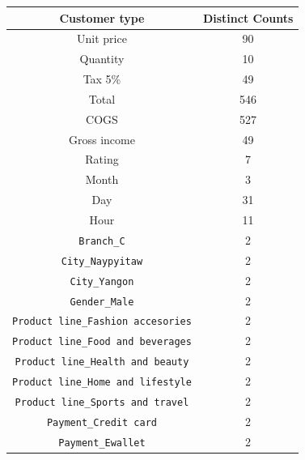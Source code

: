 \begin{table}[htbp]
    \centering
    \begin{adjustbox}{max width=\textwidth} %
        \begin{tabular}{|>{\columncolor{blue!50}}c|c|}
            \hline
            \rowcolor{blue!50} %
            \textbf{Customer type} & \textbf{Distinct Counts} \\
            \hline
            Unit price  & 90 \\
            Quantity  & 10 \\
            Tax 5\% & 49 \\
            Total & 546 \\
            COGS & 527 \\
            Gross income & 49 \\
            Rating & 7 \\
            Month & 3 \\
            Day & 31 \\
            Hour & 11 \\
            \verb|Branch_C| & 2 \\
            \verb|City_Naypyitaw| & 2\\
            \verb|City_Yangon| & 2 \\
            \verb|Gender_Male| & 2 \\
            \verb|Product line_Fashion accesories| & 2 \\
            \verb|Product line_Food and beverages| & 2 \\
            \verb|Product line_Health and beauty| & 2 \\
            \verb|Product line_Home and lifestyle| & 2 \\
            \verb|Product line_Sports and travel| & 2 \\
            \verb|Payment_Credit card| & 2 \\
            \verb|Payment_Ewallet| & 2 \\
            \hline
        \end{tabular}
    \end{adjustbox}
    \label{tab:3x2_table}
\end{table}

